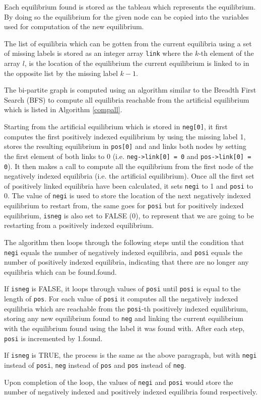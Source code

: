 Each equilibrium found is stored as the tableau which represents
the equilibrium. By doing so the equilibrium for the given
node can be copied into the variables used for computation of the
new equilibrium.

The list of equilibria which can be gotten from the current equilibria
using a set of missing labels is stored as an integer array \verb|link|
where the $k$-th element of the array $l$, is the location of the
equilibrium the current equilibrium is linked to in the opposite
list by the missing label $k-1$.

The bi-partite graph is computed using an algorithm similar to the 
Breadth First Search (BFS) to compute all equilibria reachable from
the artificial equilibrium which is listed in Algorithm \ref{compall}.


Starting from the artificial equilibrium which is stored in \verb|neg[0]|,
it first computes the first positively indexed equilibrium by using the
missing label 1, stores the resulting equilibrium in \verb|pos[0]| and
and links both nodes by setting the first element of both links to 0
(i.e. \verb|neg->link[0] = 0| and \verb|pos->link[0] = 0|). It then makes
a call to compute all the equilibrium from the first node of the negatively
indexed equilibria (i.e. the artificial equilibrium). Once all the first set
of positively linked equilibria have been calculated, it sets \verb|negi| to
1 and \verb|posi| to 0. The value of \verb|negi| is used to store the location
of the next negatively indexed equilibrium to restart from, the same goes for
\verb|posi| but for positively indexed equilibrium, \verb|isneg| is also set to
FALSE (0), to represent that we are going to be restarting from a positively indexed
equilibrium.

The algorithm then loops through the following steps until the condition
that \verb|negi| equals the number of negatively indexed equilibria, and
\verb|posi| equals the number of positively indexed equilibria, indicating
that there are no longer any equilibria which can be found.found.

If \verb|isneg| is FALSE, it loops through values of \verb|posi| until \verb|posi|
is equal to the length of \verb|pos|. For each value of \verb|posi| it computes
all the negatively indexed equilibria which are reachable from the \verb|posi|-th 
positively indexed equilibrium, storing any new equilibrium found to \verb|neg|
and linking the current equilibrium with the equilibrium found using the label it
was found with. After each step, \verb|posi| is incremented by 1.found.

If \verb|isneg| is TRUE, the process is the same as the above paragraph, but
with \verb|negi| instead of \verb|posi|, \verb|neg| instead of \verb|pos| and
\verb|pos| instead of \verb|neg|.

Upon completion of the loop, the values of \verb|negi| and \verb|posi| would
store the number of negatively indexed and positively indexed equilibria found
respectively.